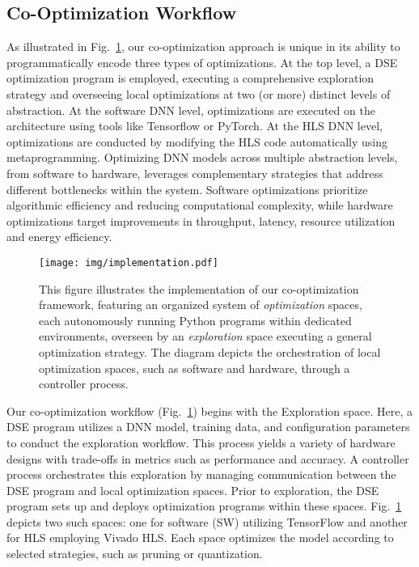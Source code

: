 \subsection{Co-Optimization Workflow}
As illustrated in Fig.~\ref{fig:opt_flow}, our co-optimization approach is unique in its ability to programmatically encode three types of optimizations. At the top level, a DSE optimization program is employed, executing a comprehensive exploration strategy and overseeing local optimizations at two (or more) distinct levels of abstraction. At the software DNN level, optimizations are executed on the architecture using tools like Tensorflow or PyTorch. At the HLS DNN level, optimizations are conducted by modifying the HLS code automatically  using metaprogramming. Optimizing DNN models across multiple abstraction levels, from software to hardware, leverages complementary strategies that address different bottlenecks within the system. Software optimizations prioritize algorithmic efficiency and reducing computational complexity, while hardware optimizations target improvements in throughput, latency, resource utilization and energy efficiency.


\begin{figure}[tp]
    \begin{center}
    \texttt{[image: img/implementation.pdf]}
    \end{center}
       \caption{This figure illustrates the implementation of our co-optimization framework, featuring an organized system of \textit{optimization} spaces, each autonomously running Python programs within dedicated environments, overseen by an \textit{exploration} space executing a general optimization strategy. The diagram depicts the orchestration of local optimization spaces, such as software and hardware, through a controller process.}
    \label{fig:opt_flow}
\end{figure}

Our co-optimization workflow (Fig.~\ref{fig:opt_flow}) begins with the Exploration space. Here, a DSE program utilizes a DNN model, training data, and configuration parameters to conduct the exploration workflow. This process yields a variety of hardware designs with trade-offs in metrics such as performance and accuracy. A controller process orchestrates this exploration by managing communication between the DSE program and local optimization spaces. Prior to exploration, the DSE program sets up and deploys optimization programs within these spaces. Fig.~\ref{fig:opt_flow} depicts two such spaces: one for software (SW) utilizing TensorFlow and another for HLS employing Vivado HLS. Each space optimizes the model according to selected strategies, such as pruning or quantization. 


